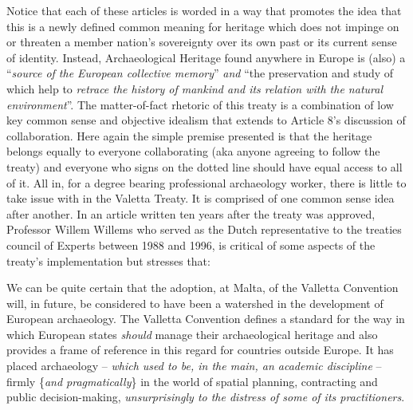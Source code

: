 \documentclass[spanish]{ijsra}
\begin{document}
Notice that each of these articles is worded in a way that promotes the idea that this is a newly defined common meaning for heritage which does not impinge on or threaten a member nation’s sovereignty over its own past or its current sense of identity. Instead, Archaeological Heritage found anywhere in Europe is (also) a “\textit{source of the European collective memory}” \textit{and} “the preservation and study of which help to \textit{retrace the history of mankind and its relation with the natural environment}”. 
The matter-of-fact rhetoric of this treaty is a combination of low key common sense and objective idealism that extends to Article 8’s discussion of collaboration. Here again the simple premise presented is that the heritage belongs equally to everyone collaborating (aka anyone agreeing to follow the treaty) and everyone who signs on the dotted line should have equal access to all of it. All in, for a degree bearing professional archaeology worker, there is little to take issue with in the Valetta Treaty. It is comprised of one common sense idea after another. In an article written ten years after the treaty was approved, Professor Willem Willems who served as the Dutch representative to the treaties council of Experts between 1988 and 1996, is critical of some aspects of the treaty’s implementation but stresses that:

\begin{displayquote}
	We can be quite certain that the adoption, at Malta, of the Valletta Convention will, in future, be considered to have been a watershed in the development of European archaeology. The Valletta Convention defines a standard for the way in which European states \textit{should} manage their archaeological heritage and also provides a frame of reference in this regard for countries outside Europe. It has placed archaeology – \textit{which used to be, in the main, an academic discipline} – firmly \{\textit{and pragmatically}\} in the world of spatial planning, contracting and public decision-making, \textit{unsurprisingly to the distress of some of its practitioners}. %
	\end{displayquote}
\end{document}
